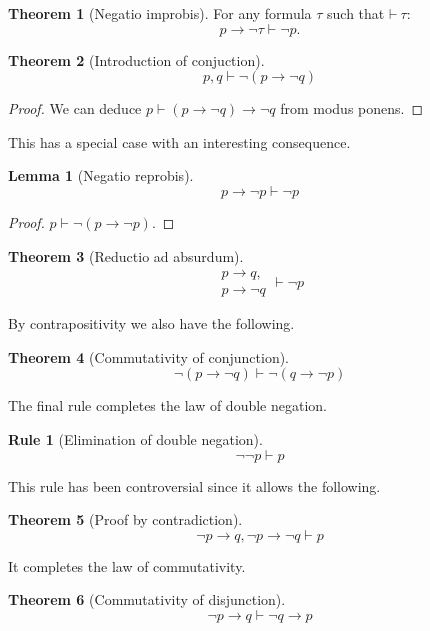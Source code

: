 \documentclass{amsbook}
\newcommand{\infers}{\mathrel\vdash}
\newcommand{\theorem}{\mathord\vdash\medspace}
\newcommand{\then}{\mathrel\rightarrow}
\theoremstyle{definition}
\newtheorem{frule}{Rule}[section]
\newtheorem{thm}{Theorem}[section]
\newtheorem{lmm}{Lemma}[section]
\begin{document}
\begin{thm}[Negatio improbis]
    For any formula $\tau$ such that $\theorem \tau$:
    $$p \then \neg \tau \infers \neg p.$$
\end{thm}

\begin{thm}[Introduction of conjuction]
    $$p, q \infers \neg(p \then \neg q)$$
    \begin{proof}
        We can deduce $p \infers (p \then \neg q) \then \neg q$ from modus ponens.
    \end{proof}
\end{thm}

This has a special case with an interesting consequence.

\begin{lmm}[Negatio reprobis]
    $$p \then \neg p \infers \neg p$$
    \begin{proof}
        $p \infers \neg(p \then \neg p)$.
    \end{proof}
\end{lmm}

\begin{thm}[Reductio ad absurdum]
    $$\begin{aligned}
            p \then q, \\ p \then \neg q
        \end{aligned} \infers \neg p$$
\end{thm}

By contrapositivity we also have the following.

\begin{thm}[Commutativity of conjunction]
    $$\neg(p \then \neg q) \infers \neg(q \then \neg p)$$
\end{thm}

The final rule completes the law of double negation.

\begin{frule}[Elimination of double negation]
    $${\neg\neg p} \infers p$$
\end{frule}

This rule has been controversial since it allows the following.

\begin{thm}[Proof by contradiction]
    $$\neg p \then q, \neg p \then \neg q \infers p$$
\end{thm}

It completes the law of commutativity.

\begin{thm}[Commutativity of disjunction]
    $$\neg p \then q \infers \neg q \then p$$
\end{thm}
\end{document}
